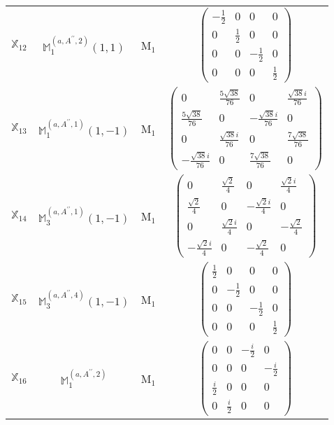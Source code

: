 \documentclass[fleqn,10pt,landscape]{article}
\begin{document}
\begin{itemize}
\begin{center}
\begin{longtable}{c|c|c|c}
$ \mathbb{X}_{12} $ & $\mathbb{M}_{1}^{(a,A^{\prime\prime},2)}(1,1)$ & M$_{1}$ & $\begin{pmatrix} - \frac{1}{2} & 0 & 0 & 0 \\ 0 & \frac{1}{2} & 0 & 0 \\ 0 & 0 & - \frac{1}{2} & 0 \\ 0 & 0 & 0 & \frac{1}{2} \end{pmatrix}$ \\
$ \mathbb{X}_{13} $ & $\mathbb{M}_{1}^{(a,A^{\prime\prime},1)}(1,-1)$ & M$_{1}$ & $\begin{pmatrix} 0 & \frac{5 \sqrt{38}}{76} & 0 & \frac{\sqrt{38} i}{76} \\ \frac{5 \sqrt{38}}{76} & 0 & - \frac{\sqrt{38} i}{76} & 0 \\ 0 & \frac{\sqrt{38} i}{76} & 0 & \frac{7 \sqrt{38}}{76} \\ - \frac{\sqrt{38} i}{76} & 0 & \frac{7 \sqrt{38}}{76} & 0 \end{pmatrix}$ \\
$ \mathbb{X}_{14} $ & $\mathbb{M}_{3}^{(a,A^{\prime\prime},1)}(1,-1)$ & M$_{1}$ & $\begin{pmatrix} 0 & \frac{\sqrt{2}}{4} & 0 & \frac{\sqrt{2} i}{4} \\ \frac{\sqrt{2}}{4} & 0 & - \frac{\sqrt{2} i}{4} & 0 \\ 0 & \frac{\sqrt{2} i}{4} & 0 & - \frac{\sqrt{2}}{4} \\ - \frac{\sqrt{2} i}{4} & 0 & - \frac{\sqrt{2}}{4} & 0 \end{pmatrix}$ \\
$ \mathbb{X}_{15} $ & $\mathbb{M}_{3}^{(a,A^{\prime\prime},4)}(1,-1)$ & M$_{1}$ & $\begin{pmatrix} \frac{1}{2} & 0 & 0 & 0 \\ 0 & - \frac{1}{2} & 0 & 0 \\ 0 & 0 & - \frac{1}{2} & 0 \\ 0 & 0 & 0 & \frac{1}{2} \end{pmatrix}$ \\
$ \mathbb{X}_{16} $ & $\mathbb{M}_{1}^{(a,A^{\prime\prime},2)}$ & M$_{1}$ & $\begin{pmatrix} 0 & 0 & - \frac{i}{2} & 0 \\ 0 & 0 & 0 & - \frac{i}{2} \\ \frac{i}{2} & 0 & 0 & 0 \\ 0 & \frac{i}{2} & 0 & 0 \end{pmatrix}$ \\
\end{longtable}

\end{center}
\end{itemize}
\end{document}
